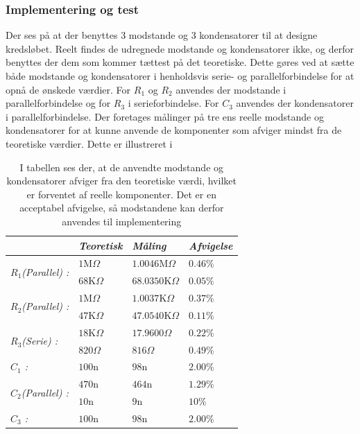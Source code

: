 \subsubsection{Implementering og test}
Der ses på  at der benyttes 3 modstande og 3 kondensatorer til at designe kredsløbet. Reelt findes de udregnede modstande og kondensatorer ikke, og derfor benyttes der dem som kommer tættest på det teoretiske. Dette gøres ved at sætte både modstande og kondensatorer i henholdsvis serie- og parallelforbindelse for at opnå de ønskede værdier. For $R_{1}$ og $R_{2}$ anvendes der modstande i parallelforbindelse og for $R_{3}$ i serieforbindelse. For $C_3$ anvendes der kondensatorer i parallelforbindelse. Der foretages målinger på tre ens reelle modstande og kondensatorer for at kunne anvende de komponenter som afviger mindst fra de teoretiske værdier. Dette er illustreret i 
\begin{table}[H]
	\centering
	\begin{tabular}{|l|l|l|l|}
		\hline
		\textit{}                                     & \textit{Teoretisk} & \textit{Måling}    & \textit{Afvigelse} \\ \hline
		\multirow{2}{*}{\textit{$R_{1}$(Parallel) :}} & $1$M$\Omega$       & $1.0046$M$\Omega$  & $0.46\%$           \\ \cline{2-4} 
		& $68$K$\Omega$      & $68.0350$K$\Omega$ & $0.05\%$           \\ \hline
		\multirow{2}{*}{\textit{$R_{2}$(Parallel) :}} & $1$M$\Omega$       & $1.0037$K$\Omega$  & $0.37\%$           \\ \cline{2-4} 
		& $47$K$\Omega$      & $47.0540$K$\Omega$ & $0.11\%$           \\ \hline
		\multirow{2}{*}{\textit{$R_{3}$(Serie) :}}    & $18$K$\Omega$      & $17.9600\Omega$    & $0.22\%$           \\ \cline{2-4} 
		& $820\Omega$        & $816\Omega$        & $0.49\%$           \\ \hline
		\textit{$C_{1}$ :}                            & $100$n             & $98$n              & $2.00\%$           \\ \hline
		\multirow{2}{*}{\textit{$C_{2}$(Parallel) :}} & $470$n             & $464$n             & $1.29\%$           \\ \cline{2-4} 
		& $10$n              & $9$n               & $10\%$             \\ \hline
		\textit{$C_{3}$ :}                            & $100$n             & $98$n              & $2.00\%$           \\ \hline
	\end{tabular}
	\caption{I tabellen ses der, at de anvendte modstande og kondensatorer afviger fra den teoretiske værdi, hvilket er forventet af reelle komponenter. Det er en acceptabel afvigelse, så modstandene kan derfor anvendes til implementering}
	\label{Tab:Maalingfilter}
\end{table}
